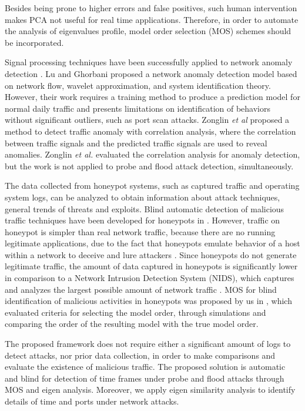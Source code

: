 \documentclass[review]{elsarticle}
\begin{document}
Besides being prone to higher errors and false positives, such human intervention makes PCA not useful for real time applications. Therefore, in order to automate the analysis of eigenvalues profile, model order selection (MOS) schemes should be incorporated.

Signal processing techniques have been successfully applied to network anomaly detection \cite{Lu2009}. Lu and Ghorbani \cite{Lu2009} proposed a network anomaly detection model based on network flow, wavelet approximation, and system identification theory. However, their work requires a training method to produce a prediction model for normal daily traffic and presents limitations on identification of behaviors without significant outliers, such as port scan attacks. Zonglin \emph{et al} \cite{Zonglin2009} proposed a method to detect traffic anomaly with correlation analysis, where the correlation between traffic signals and the predicted traffic signals are used to reveal anomalies. Zonglin \emph{et al.} \cite{Zonglin2009} evaluated the correlation analysis for anomaly detection, but the work is not applied to probe and flood attack detection, simultaneously. 

The data collected from honeypot systems, such as captured traffic and operating system logs, can be analyzed to obtain information about attack techniques, general trends of threats and exploits. Blind automatic detection of malicious traffic techniques have been developed for honeypots in \cite{david2011blind,da2012improved}. However, traffic on honeypot is simpler than real network traffic, because there are no running legitimate applications, due to the fact that honeypots emulate behavior of a host within a network to deceive and lure attackers \cite{zakaria2012review}. Since honeypots do not generate legitimate traffic, the amount of data captured in honeypots is significantly lower in comparison to a Network Intrusion Detection System (NIDS), which captures and analyzes the largest possible amount of network traffic \cite{david2011blind}. MOS for blind identification of malicious activities in honeypots was proposed by us in \cite{david2011blind}, which evaluated criteria for selecting the model order, through simulations and comparing the order of the resulting model with the true model order.

The proposed framework does not require either a significant amount of logs to detect attacks, nor prior data collection, in order to make comparisons and evaluate the existence of malicious traffic. The proposed solution is automatic and blind for detection of time frames under probe and flood attacks through MOS and eigen analysis. Moreover, we apply eigen similarity analysis to identify details of time and ports under network attacks.
\end{document}
